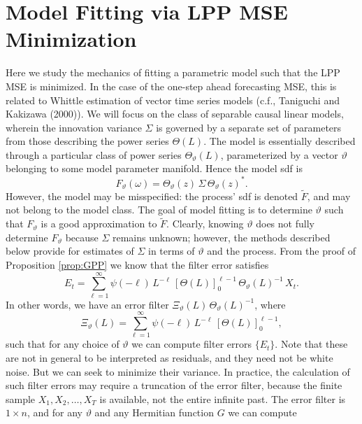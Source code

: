 \documentclass[a4paper]{book}
\begin{document}
\section{Model Fitting via LPP MSE Minimization}

 Here we study the mechanics of fitting a parametric model such that the LPP MSE
 is minimized.  In the case of the one-step ahead forecasting MSE, this is related
 to Whittle estimation of vector time series models (c.f.,  Taniguchi and Kakizawa (2000)).
  We will focus on the class of separable causal linear models, wherein the innovation variance
 $\Sigma$ is governed by a separate set of parameters from those describing the power
 series $\Theta (L)$.  The model is essentially described through a particular class of
 power series   $\Theta_{\vartheta} (L)$, parameterized by a vector $\vartheta $
  belonging to some model  parameter manifold.    Hence the model sdf is
\[
  F_{\vartheta} (\omega) = \Theta_{\vartheta} (z) \, \Sigma \,  { \Theta_{\vartheta} (z) }^*.
\]
 However, the model may be misspecified: the process' sdf is denoted $\widetilde{F}$, 
  and may not
 belong to the model class.  The goal of model fitting is to determine $\vartheta$ 
  such that
 $F_{\vartheta}$ is a good approximation to $\widetilde{F}$.  
 Clearly, knowing $\vartheta$ does not
 fully determine $F_{\vartheta}$ because $\Sigma$ remains unknown; however, the methods
 described below provide for estimates of $\Sigma$ in terms of $\vartheta$ and the process.
 From the proof of Proposition \ref{prop:GPP} we know that the filter error satisfies
\[
  E_t = \sum_{\ell =1 }^{\infty} \psi (-\ell) \, L^{-\ell} \,  {[ \Theta (L) ]}_0^{\ell - 1} \, 
   { \Theta_{\vartheta} (L) }^{-1} \, X_t.
\] 
 In other words, we have an error filter $ \Xi_{\vartheta} (L) \,  
  { \Theta_{\vartheta} (L) }^{-1}  $,
 where
\[
  \Xi_{\vartheta} (L)  = \sum_{\ell =1 }^{\infty} \psi (-\ell) \,  L^{-\ell} \,
   {[ \Theta (L) ]}_0^{\ell - 1},
\]
  such that for any choice of $\vartheta $ we can compute filter errors $\{ E_t \}$.
 Note that these are not in general to be interpreted as residuals, and they need not be white noise.
  But we can seek to minimize their variance.  In practice,
 the calculation of such filter errors  may require a truncation of the error filter, because the finite
 sample $X_1, X_2, \ldots, X_T$ is available, not the entire infinite past.  The error filter is
 $1 \times n$, and for any $\vartheta $ and any Hermitian function $G$ we can compute
\end{document}

